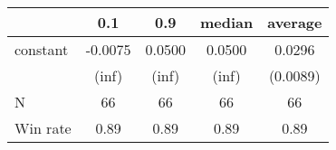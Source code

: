 \begin{tabular}{lcccc}
\hline
         &   0.1   &  0.9   & median & average   \\
\midrule
\midrule
constant & -0.0075 & 0.0500 & 0.0500 & 0.0296    \\
         & (inf)   & (inf)  & (inf)  & (0.0089)  \\
N        & 66      & 66     & 66     & 66        \\
Win rate & 0.89    & 0.89   & 0.89   & 0.89      \\
\hline
\end{tabular}